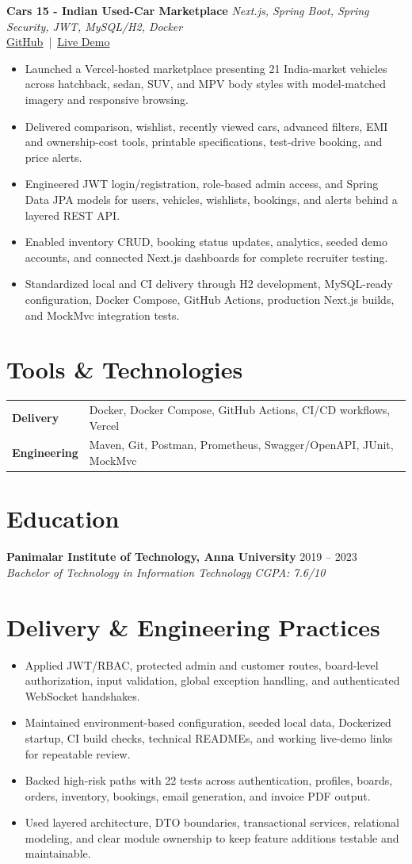 \documentclass[a4paper,10pt]{article}
\newcommand{\resumeItem}[1]{\item \small{#1}}
\newcommand{\resumeLink}[2]{\href{#1}{\textcolor{linkblue}{\underline{#2}}}}
\newcommand{\projectHeader}[4]{
  \vspace{4pt}
  \textbf{#1} \hfill {\small \emph{#2}} \\
  {\footnotesize #3}
  \vspace{-1pt}
}
\newcommand{\roleHeader}[4]{
  \textbf{#1} \hfill {\small #2} \\
  \textit{\small #3} \hfill \textit{\small #4}
  \vspace{-1pt}
}
\begin{document}
\projectHeader
  {Cars 15 - Indian Used-Car Marketplace}
  {Next.js, Spring Boot, Spring Security, JWT, MySQL/H2, Docker}
  {\resumeLink{https://github.com/SURYAPRAKASH123671/Luxury-car-inventory-platform}{GitHub} \,|\, \resumeLink{https://cars15.vercel.app/}{Live Demo}}
  {}
\begin{itemize}
  \resumeItem{Launched a Vercel-hosted marketplace presenting 21 India-market vehicles across hatchback, sedan, SUV, and MPV body styles with model-matched imagery and responsive browsing.}
  \resumeItem{Delivered comparison, wishlist, recently viewed cars, advanced filters, EMI and ownership-cost tools, printable specifications, test-drive booking, and price alerts.}
  \resumeItem{Engineered JWT login/registration, role-based admin access, and Spring Data JPA models for users, vehicles, wishlists, bookings, and alerts behind a layered REST API.}
  \resumeItem{Enabled inventory CRUD, booking status updates, analytics, seeded demo accounts, and connected Next.js dashboards for complete recruiter testing.}
  \resumeItem{Standardized local and CI delivery through H2 development, MySQL-ready configuration, Docker Compose, GitHub Actions, production Next.js builds, and MockMvc integration tests.}
\end{itemize}

\section*{Tools \& Technologies}
\small
\begin{tabularx}{\textwidth}{@{}>{\bfseries}p{1.22in}X@{}}
Delivery & Docker, Docker Compose, GitHub Actions, CI/CD workflows, Vercel \\
Engineering & Maven, Git, Postman, Prometheus, Swagger/OpenAPI, JUnit, MockMvc
\end{tabularx}

\section*{Education}
\roleHeader
  {Panimalar Institute of Technology, Anna University}
  {2019 -- 2023}
  {Bachelor of Technology in Information Technology}
  {CGPA: 7.6/10}

\section*{Delivery \& Engineering Practices}
\begin{itemize}
  \resumeItem{Applied JWT/RBAC, protected admin and customer routes, board-level authorization, input validation, global exception handling, and authenticated WebSocket handshakes.}
  \resumeItem{Maintained environment-based configuration, seeded local data, Dockerized startup, CI build checks, technical READMEs, and working live-demo links for repeatable review.}
  \resumeItem{Backed high-risk paths with 22 tests across authentication, profiles, boards, orders, inventory, bookings, email generation, and invoice PDF output.}
  \resumeItem{Used layered architecture, DTO boundaries, transactional services, relational modeling, and clear module ownership to keep feature additions testable and maintainable.}
\end{itemize}
\end{document}
